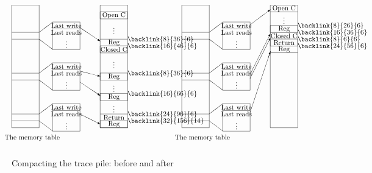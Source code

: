 \newcommand{\rwblock}
{\begin{picture}(100,40)(-40,0)
\put(0,25){\line(4,3){20}}
\put(0,15){\line(4,-3){20}}
\put(-40,25){\line(1,0){40}}
\put(-40,15){\line(1,0){40}}
\put(20,0){\framebox(40,40){\ }}
\put(20,30){\line(1,0){40}}
\put(20,30){\makebox(40,10){Last write}}
\put(20,20){\makebox(40,10){Last reads}}
\put(20,5){\makebox(40,10){\vdots}}
\end{picture}}
\begin{figure*}
\small
\hrulefill
\[
\begin{picture}(250,210)(-30,0)
\put(-30,30){\framebox(40,180)[t]{\ }}
\put(-30,10){\makebox(60,10){The memory table}}
\put(-30,145){\rwblock}
\put(70,177){\vector(3,-2){30}}
\put(-30,85){\rwblock}
\put(70,113){\vector(4,-1){30}}
\put(70,97){\vector(3,-2){30}}
\put(-30,25){\rwblock}
\put(70,50){\vector(2,-1){30}}
\put(100,30){\framebox(40,180)[t]{\ }}
\put(100,190){\framebox(40,10){Open C}}
\put(100,170){\makebox(40,10){\vdots}}
\put(100,160){\line(1,0){40}}
\put(100,150){\makebox(40,10){Reg}}
\put(140,157){\backlink{8}{36}{6}}
\put(100,140){\framebox(40,10){Closed C}}
\put(140,147){\backlink{16}{46}{6}}
\put(100,120){\makebox(40,10){\vdots}}
\put(100,100){\framebox(40,10){Reg}}
\put(140,107){\backlink{8}{36}{6}}
\put(100,85){\makebox(40,10){\vdots}}
\put(100,70){\framebox(40,10){Reg}}
\put(140,77){\backlink{16}{66}{6}}
\put(100,50){\line(1,0){40}}
\put(100,55){\makebox(40,10){\vdots}}
\put(100,40){\makebox(40,10){Return}}
\put(140,47){\backlink{24}{96}{6}}
\put(100,30){\framebox(40,10){Reg}}
\put(140,37){\backlink{32}{156}{14}}
\end{picture}
%
%
\begin{picture}(200,210)(-30,0)
\put(-30,30){\framebox(40,180)[t]{\ }}
\put(-30,10){\makebox(60,10){The memory table}}
\put(-30,145){\rwblock}
\put(70,181){\vector(4,3){30}}
\put(-30,85){\rwblock}
\put(70,108){\vector(1,2){30}}
\put(70,102){\vector(1,2){30}}
\put(-30,25){\rwblock}
\put(70,52){\vector(1,3){30}}
\put(100,30){\framebox(40,180)[t]{\ }}
\put(100,200){\makebox(40,10){Open C}}
\put(100,200){\line(1,0){40}}
\put(100,185){\makebox(40,10){\vdots}}
\put(100,170){\framebox(40,10){Reg}}
\put(140,177){\backlink{8}{26}{6}}
\put(100,160){\makebox(40,10){Closed C}}
\put(140,167){\backlink{16}{36}{6}}
\put(100,150){\framebox(40,10){Return}}
\put(140,157){\backlink{8}{6}{6}}
\put(100,140){\makebox(40,10){Reg}}
\put(140,147){\backlink{24}{56}{6}}
\put(100,140){\line(1,0){40}}
\end{picture}
\]
\hrulefill
\caption{Compacting the trace pile: before and after}
\label{fnyembladata}
\end{figure*}


